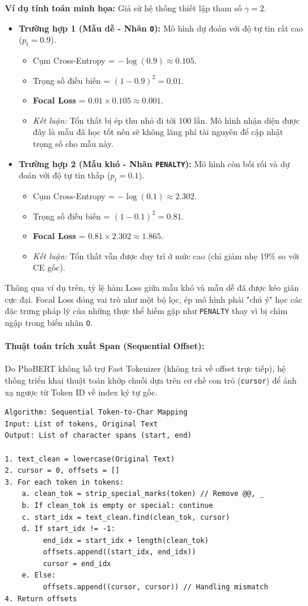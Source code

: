 \textbf{Ví dụ tính toán minh họa:} Giả sử hệ thống thiết lập tham số $\gamma = 2$.
\begin{itemize}
    \item \textbf{Trường hợp 1 (Mẫu dễ - Nhãn \texttt{O}):} Mô hình dự đoán với độ tự tin rất cao ($p_t = 0.9$).
    \begin{itemize}
        \item Cụm Cross-Entropy = $-\log(0.9) \approx 0.105$.
        \item Trọng số điều biến = $(1 - 0.9)^2 = 0.01$.
        \item \textbf{Focal Loss} = $0.01 \times 0.105 \approx 0.001$.
        \item \textit{Kết luận:} Tổn thất bị ép thu nhỏ đi tới 100 lần. Mô hình nhận diện được đây là mẫu đã học tốt nên sẽ không lãng phí tài nguyên để cập nhật trọng số cho mẫu này.
    \end{itemize}
    \item \textbf{Trường hợp 2 (Mẫu khó - Nhãn \texttt{PENALTY}):} Mô hình còn bối rối và dự đoán với độ tự tin thấp ($p_t = 0.1$).
    \begin{itemize}
        \item Cụm Cross-Entropy = $-\log(0.1) \approx 2.302$.
        \item Trọng số điều biến = $(1 - 0.1)^2 = 0.81$.
        \item \textbf{Focal Loss} = $0.81 \times 2.302 \approx 1.865$.
        \item \textit{Kết luận:} Tổn thất vẫn được duy trì ở mức cao (chỉ giảm nhẹ 19\% so với CE gốc).
    \end{itemize}
\end{itemize}
Thông qua ví dụ trên, tỷ lệ hàm Loss giữa mẫu khó và mẫu dễ đã được kéo giãn cực đại. Focal Loss đóng vai trò như một bộ lọc, ép mô hình phải "chú ý" học các đặc trưng pháp lý của những thực thể hiếm gặp như \texttt{PENALTY} thay vì bị chìm ngập trong biển nhãn \texttt{O}.

\paragraph{Thuật toán trích xuất Span (Sequential Offset):}
Do PhoBERT không hỗ trợ Fast Tokenizer (không trả về offset trực tiếp), hệ thống triển khai thuật toán khớp chuỗi dựa trên cơ chế con trỏ (\texttt{cursor}) để ánh xạ ngược từ Token ID về index ký tự gốc.

\begin{verbatim}
Algorithm: Sequential Token-to-Char Mapping
Input: List of tokens, Original Text
Output: List of character spans (start, end)

1. text_clean = lowercase(Original Text)
2. cursor = 0, offsets = []
3. For each token in tokens:
    a. clean_tok = strip_special_marks(token) // Remove @@, _
    b. If clean_tok is empty or special: continue
    c. start_idx = text_clean.find(clean_tok, cursor)
    d. If start_idx != -1:
         end_idx = start_idx + length(clean_tok)
         offsets.append((start_idx, end_idx))
         cursor = end_idx
    e. Else: 
         offsets.append((cursor, cursor)) // Handling mismatch
4. Return offsets
\end{verbatim}

